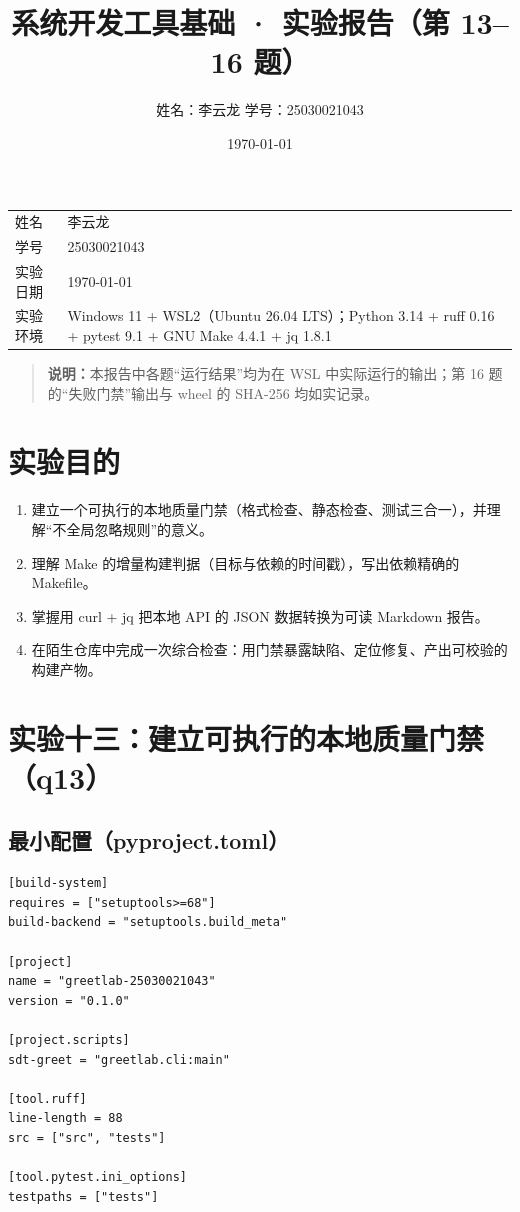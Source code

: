 \documentclass[UTF8,fontset=ubuntu]{ctexart}
\title{\textbf{系统开发工具基础 · 实验报告（第 13--16 题）}}
\author{姓名：李云龙 \quad 学号：25030021043}
\date{\today}
\begin{document}
\maketitle

\begin{center}
\begin{tabular}{@{}p{3cm}p{11.5cm}@{}}
\toprule
姓名 & 李云龙 \\
学号 & 25030021043 \\
实验日期 & \today \\
实验环境 & Windows 11 + WSL2（Ubuntu 26.04 LTS）；Python 3.14 + ruff 0.16 + pytest 9.1 + GNU Make 4.4.1 + jq 1.8.1 \\
\bottomrule
\end{tabular}
\end{center}

\begin{quote}
\textbf{说明：}本报告中各题“运行结果”均为在 WSL 中实际运行的输出；第 16 题的“失败门禁”输出与 wheel 的 SHA-256 均如实记录。
\end{quote}

\section{实验目的}
\begin{enumerate}
\item 建立一个可执行的本地质量门禁（格式检查、静态检查、测试三合一），并理解“不全局忽略规则”的意义。
\item 理解 Make 的增量构建判据（目标与依赖的时间戳），写出依赖精确的 Makefile。
\item 掌握用 curl + jq 把本地 API 的 JSON 数据转换为可读 Markdown 报告。
\item 在陌生仓库中完成一次综合检查：用门禁暴露缺陷、定位修复、产出可校验的构建产物。
\end{enumerate}

\section{实验十三：建立可执行的本地质量门禁（q13）}

\subsection{最小配置（pyproject.toml）}
\begin{lstlisting}
[build-system]
requires = ["setuptools>=68"]
build-backend = "setuptools.build_meta"

[project]
name = "greetlab-25030021043"
version = "0.1.0"

[project.scripts]
sdt-greet = "greetlab.cli:main"

[tool.ruff]
line-length = 88
src = ["src", "tests"]

[tool.pytest.ini_options]
testpaths = ["tests"]
\end{lstlisting}
\end{document}
